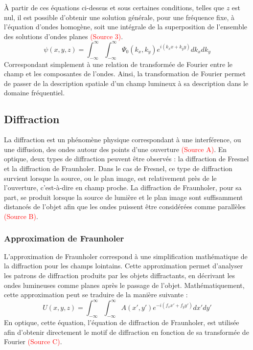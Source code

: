 \documentclass[11pt,letterpaper]{article}
\begin{document}
À partir de ces équations ci-dessus et sous certaines conditions, telles que $z$ est nul, il est possible d'obtenir une solution générale, pour une fréquence fixe, à l'équation d'ondes homogène, soit une intégrale de la superposition de l'ensemble des solutions d'ondes planes \textcolor{red}{(Source 3)}.
\begin{equation}
  \psi(x, y, z)=\int_{-\infty}^{\infty}\int_{-\infty}^{\infty}\Psi_{0}(k_{x},k_{y})e^{i(k_{x}x+k_{y}y)}dk_{x}dk_{y}
\end{equation}
Correspondant simplement à une relation de transformée de Fourier entre le champ et les composantes de l'ondes. Ainsi, la transformation de Fourier permet de passer de la description spatiale d’un champ lumineux à sa description dans le domaine fréquentiel.


\subsection{Diffraction}
La diffraction est un phénomène physique correspondant à une interférence, ou une diffusion, des ondes autour des points d'une ouverture \textcolor{red}{(Source A)}. En optique, deux types de diffraction peuvent être observés : la diffraction de Fresnel et la diffraction de Fraunholer. Dans le cas de Fresnel, ce type de diffraction survient lorsque la source, ou le plan image, est relativement près de le l'ouverture, c'est-à-dire en champ proche. La diffraction de Fraunholer, pour sa part, se produit lorsque la source de lumière et le plan image sont suffisamment distancés de l'objet afin que les ondes puissent être considérées comme parallèles \textcolor{red}{(Source B)}.


\subsubsection{Approximation de Fraunholer}
L'approximation de Fraunholer correspond à une simplification mathématique de la diffraction pour les champs lointains. Cette approximation permet d'analyser les patrons de diffraction produits par les objets diffractants, en décrivant les ondes lumineuses comme planes après le passage de l'objet. Mathématiquement, cette approximation peut se traduire de la manière suivante :
\begin{equation}
  U(x,y,z)=\int_{-\infty}^{\infty}\int_{-\infty}^{\infty}A(x',y')e^{-i(f_{x}x'+f_{y}y')}dx'dy'
\end{equation}
En optique, cette équation, l'équation de diffraction de Fraunholer, est utilisée afin d'obtenir directement le motif de diffraction en fonction de sa transformée de Fourier \textcolor{red}{(Source C)}. 
\end{document}

